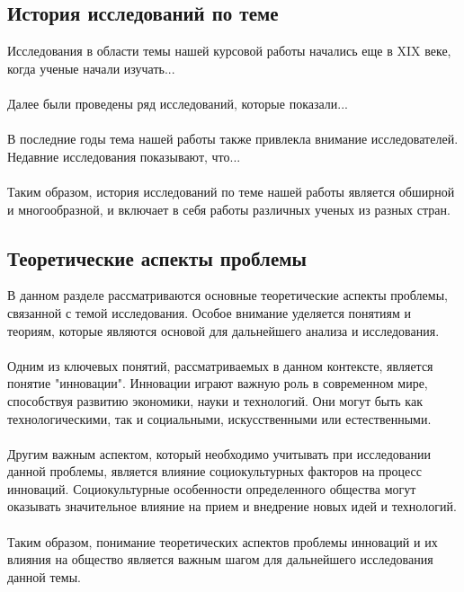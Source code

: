 \documentclass{article}
\begin{document}
\subsection{История исследований по теме}
Исследования в области темы нашей курсовой работы начались еще в XIX веке, когда ученые начали изучать...\\
~\\
Далее были проведены ряд исследований, которые показали...\\
~\\
В последние годы тема нашей работы также привлекла внимание исследователей. Недавние исследования показывают, что...\\
~\\
Таким образом, история исследований по теме нашей работы является обширной и многообразной, и включает в себя работы различных ученых из разных стран.
\subsection{Теоретические аспекты проблемы}
В данном разделе рассматриваются основные теоретические аспекты проблемы, связанной с темой исследования. Особое внимание уделяется понятиям и теориям, которые являются основой для дальнейшего анализа и исследования.\\
~\\
Одним из ключевых понятий, рассматриваемых в данном контексте, является понятие "{}инновации"{}. Инновации играют важную роль в современном мире, способствуя развитию экономики, науки и технологий. Они могут быть как технологическими, так и социальными, искусственными или естественными.\\
~\\
Другим важным аспектом, который необходимо учитывать при исследовании данной проблемы, является влияние социокультурных факторов на процесс инноваций. Социокультурные особенности определенного общества могут оказывать значительное влияние на прием и внедрение новых идей и технологий.\\
~\\
Таким образом, понимание теоретических аспектов проблемы инноваций и их влияния на общество является важным шагом для дальнейшего исследования данной темы.
\end{document}
